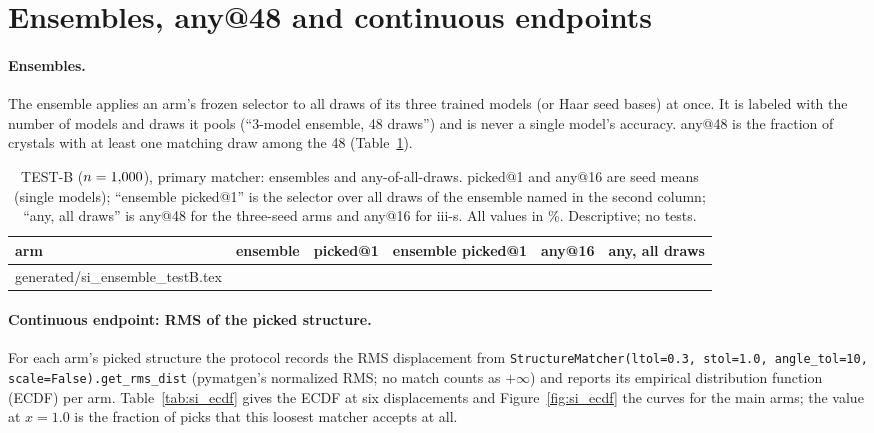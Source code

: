 \documentclass[journal=acsodf,manuscript=article]{achemso}
\makeatletter
\newcommand{\inputrows}[1]{\@@input #1 }
\makeatother
\begin{document}
\clearpage
\section{Ensembles, any@48 and continuous endpoints}\label{si:ensembles}
\paragraph{Ensembles.} The ensemble applies an arm's frozen selector to all draws of its three
trained models (or Haar seed bases) at once. It is labeled with the number of models and
draws it pools (``3-model ensemble, 48 draws'') and is never a single model's accuracy.
any@48 is the fraction of crystals with at least one matching draw among the 48
(Table~\ref{tab:si_ensemble}).

\begin{table}[htbp]
\caption{TEST-B ($n=1{,}000$), primary matcher: ensembles and any-of-all-draws. picked@1 and
any@16 are seed means (single models); ``ensemble picked@1'' is the selector over all draws of
the ensemble named in the second column; ``any, all draws'' is any@48 for the three-seed arms
and any@16 for iii-s. All values in \%. Descriptive; no tests.}
\label{tab:si_ensemble}
\centering
\footnotesize
\setlength{\tabcolsep}{3pt}
\begin{tabular}{@{}llcccc@{}}
\toprule
arm & ensemble & picked@1 & ensemble picked@1 & any@16 & any, all draws \\
\midrule
\inputrows{generated/si_ensemble_testB.tex}
\bottomrule
\end{tabular}
\end{table}

\paragraph{Continuous endpoint: RMS of the picked structure.} For each arm's picked structure
the protocol records the RMS displacement from
\texttt{StructureMatcher(ltol=0.3, stol=1.0, angle\_tol=10, scale=False).get\_rms\_dist}
(pymatgen's normalized RMS; no match counts as $+\infty$) and reports its empirical
distribution function (ECDF) per arm. Table~\ref{tab:si_ecdf} gives the ECDF at six
displacements and Figure~\ref{fig:si_ecdf} the curves for the main arms; the value at $x=1.0$
is the fraction of picks that this loosest matcher accepts at all.
\end{document}
